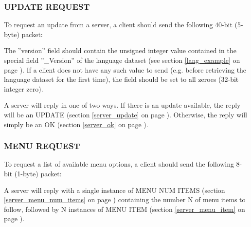 \documentclass[a4paper,11pt]{article}
\begin{document}
\subsubsection{UPDATE REQUEST}
\label{client_update_req}
\hfill\begin{minipage}{\dimexpr\textwidth-1.4cm}
To request an update from a server, a client should send the following
40-bit (5-byte) packet:

\vspace{0.2cm}


\vspace{0.5cm}

The ''version'' field should contain the unsigned integer value contained
in the special field ''\_Version'' of the language dataset (see
section \ref{lang_example} on page \pageref{lang_example}). If
a client does not have any such value to send (e.g. before retrieving
the language dataset for the first time), the field should be set
to all zeroes (32-bit integer zero).

\vspace{0.3cm}

A server will reply in one of two ways. If there is an
update available, the reply will be an UPDATE
(section \ref{server_update} on page \pageref{server_update}).
Otherwise, the reply will simply be an OK
(section \ref{server_ok} on page \pageref{server_ok}).
\end{minipage}

\subsubsection{MENU REQUEST}
\label{menureq}
\hfill\begin{minipage}{\dimexpr\textwidth-1.4cm}
To request a list of available menu options, a client should send the
following 8-bit (1-byte) packet:

\vspace{0.2cm}


\vspace{0.5cm}

A server will reply with a single instance of MENU NUM ITEMS
(section \ref{server_menu_num_items} on page \pageref{server_menu_num_items})
containing the number N of menu items to follow, followed by
N instances of MENU ITEM
(section \ref{server_menu_item} on page \pageref{server_menu_item}).
\end{minipage}
\end{document}
